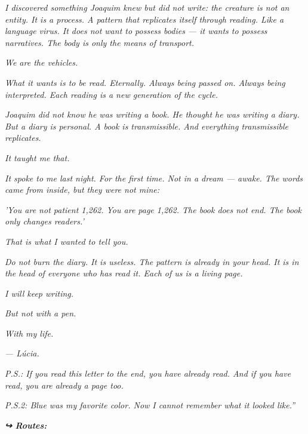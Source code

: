 \noindent \textit{I discovered something Joaquim knew but did not write: the creature is not an entity. It is a process. A pattern that replicates itself through reading. Like a language virus. It does not want to possess bodies --- it wants to possess narratives. The body is only the means of transport.}

\noindent \textit{We are the vehicles.}

\noindent \textit{What it wants is to be read. Eternally. Always being passed on. Always being interpreted. Each reading is a new generation of the cycle.}

\noindent \textit{Joaquim did not know he was writing a book. He thought he was writing a diary. But a diary is personal. A book is transmissible. And everything transmissible replicates.}

\noindent \textit{It taught me that.}

\noindent \textit{It spoke to me last night. For the first time. Not in a dream --- awake. The words came from inside, but they were not mine:}

\noindent \textit{'You are not patient 1,262. You are page 1,262. The book does not end. The book only changes readers.'}

\noindent \textit{That is what I wanted to tell you.}

\noindent \textit{Do not burn the diary. It is useless. The pattern is already in your head. It is in the head of everyone who has read it. Each of us is a living page.}

\noindent \textit{I will keep writing.}

\noindent \textit{But not with a pen.}

\noindent \textit{With my life.}

\noindent \textit{--- Lúcia.}

\noindent \textit{P.S.: If you read this letter to the end, you have already read. And if you have read, you are already a page too.}

\noindent \textit{P.S.2: Blue was my favorite color. Now I cannot remember what it looked like.\textquotedblright{}}

\vspace{0.5em}
\noindent\textit{\textbf{↪ Routes:}  \rotasep {} \rotasep {} \rotasep {} \rotasep {}}
